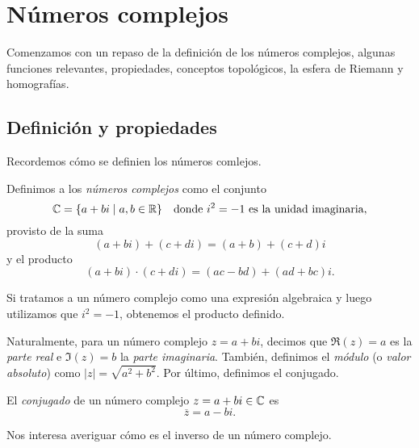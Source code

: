 \chapter{Números complejos}

Comenzamos con un repaso de la definición de los números complejos, algunas funciones relevantes, propiedades, conceptos topológicos, la esfera de Riemann y homografías.

\section{Definición y propiedades}

Recordemos cómo se definien los números comlejos.

\begin{definition}
    Definimos a los \emph{números complejos} como el conjunto
    \begin{equation*}
        \mathbb{C} = \{ a + bi \mid a, b \in \mathbb{R} \} \quad \text{donde } i^2 = -1 \text{ es la unidad imaginaria},
    \end{equation*}
    provisto de la suma
    \begin{equation*}
        (a + bi) + (c + di) = (a + b) + (c + d)i
    \end{equation*}
    y el producto
    \begin{equation*}
        (a + bi) \cdot (c + di) = (ac - bd) + (ad + bc)i.
    \end{equation*}
\end{definition}

\begin{remark}
    Si tratamos a un número complejo como una expresión algebraica y luego utilizamos que $i^2 = -1$, obtenemos el producto definido.
\end{remark}

Naturalmente, para un número complejo $z = a + bi$, decimos que $\Re(z) = a$ es la \textit{parte real} e $\Im(z) = b$ la \textit{parte imaginaria}. También, definimos el \textit{módulo} (o \textit{valor absoluto}) como $|z| = \sqrt{a^2 + b^2}$. Por último, definimos el conjugado.

\begin{definition}
    El \emph{conjugado} de un número complejo $z = a + bi \in \mathbb{C}$ es
    \begin{equation*}
        \overline{z} = a - bi.
    \end{equation*}
\end{definition}

Nos interesa averiguar cómo es el inverso de un número complejo.

